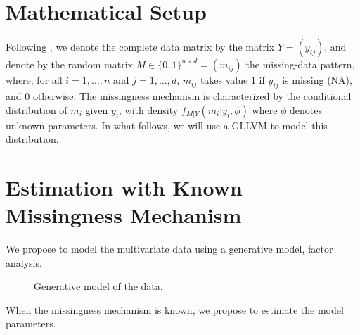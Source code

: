 \documentclass{article}
\begin{document}
\section{Mathematical Setup}
Following \textcite{little_statistical_2019}, we denote the complete data matrix  by the matrix $Y=(y_{ij})$, and denote by the random matrix $M \in \{0, 1\}^{n\times d} = (m_{ij})$ the missing-data pattern, where, for all $i=1, \dots, n$ and $j=1,  \dots, d$,  $m_{ij}$ takes value $1$ if $y_{ij}$ is missing (NA), and $0$ otherwise. The missingness mechanism is characterized by the conditional distribution of $m_i$ given $y_i$, with density $f_{M|Y}(m_i|y_i, \phi)$ where $\phi$ denotes unknown parameters. In what follows, we will use a GLLVM to model this distribution.



\section{Estimation with Known Missingness Mechanism}
We propose to model the multivariate data using a generative model, factor analysis. 

\begin{figure}
\centering
\caption{Generative model of the data.}
\end{figure}
    
    



When the missingness mechanism is known, we propose to estimate the model parameters.
\end{document}
